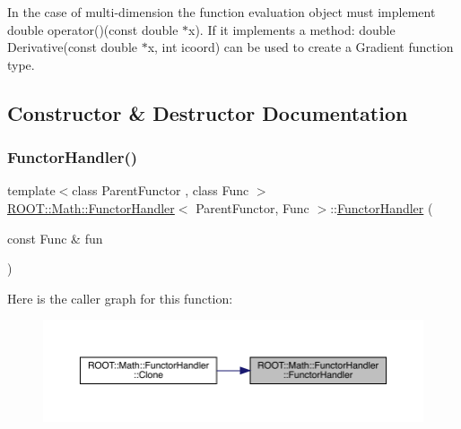 In the case of multi-\/dimension the function evaluation object must implement double operator()(const double $\ast$x). If it implements a method\+: double Derivative(const double $\ast$x, int icoord) can be used to create a Gradient function type. 

\subsection{Constructor \& Destructor Documentation}
\mbox{\label{classROOT_1_1Math_1_1FunctorHandler_ae8715a95fff0a4bbaba7a1641f936257}} 
\subsubsection{\texorpdfstring{FunctorHandler()}{FunctorHandler()}\hspace{0.1cm}{\footnotesize\ttfamily [1/4]}}
{\footnotesize\ttfamily template$<$class Parent\+Functor , class Func $>$ \\
\mbox{\hyperlink{classROOT_1_1Math_1_1FunctorHandler}{R\+O\+O\+T\+::\+Math\+::\+Functor\+Handler}}$<$ Parent\+Functor, Func $>$\+::\mbox{\hyperlink{classROOT_1_1Math_1_1FunctorHandler}{Functor\+Handler}} (\begin{DoxyParamCaption}\item[{const Func \&}]{fun }\end{DoxyParamCaption})\hspace{0.3cm}{\ttfamily [inline]}}

Here is the caller graph for this function\+:\nopagebreak
\begin{figure}[H]
\begin{center}
\leavevmode
\includegraphics[width=350pt]{d8/d4b/classROOT_1_1Math_1_1FunctorHandler_ae8715a95fff0a4bbaba7a1641f936257_icgraph}
\end{center}
\end{figure}
\mbox{\label{classROOT_1_1Math_1_1FunctorHandler_a48929822606300cdd1da079313a981b4}} 
